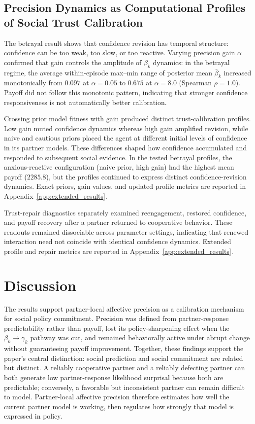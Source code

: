 \documentclass[runningheads,orivec]{llncs}
\begin{document}
\subsection{Precision Dynamics as Computational Profiles of Social Trust Calibration}
\label{sec:phenotypes}

The betrayal result shows that confidence revision has temporal structure: confidence can be too weak, too slow, or too reactive. Varying precision gain $\alpha$ confirmed that gain controls the amplitude of $\beta_k$ dynamics: in the betrayal regime, the average within-episode max--min range of posterior mean $\bar{\beta}_k$ increased monotonically from $0.097$ at $\alpha=0.05$ to $0.675$ at $\alpha=8.0$ (Spearman $\rho=1.0$). Payoff did not follow this monotonic pattern, indicating that stronger confidence responsiveness is not automatically better calibration.

Crossing prior model fitness with gain produced distinct trust-calibration profiles. Low gain muted confidence dynamics whereas high gain amplified revision, while naive and cautious priors placed the agent at different initial levels of confidence in its partner models. These differences shaped how confidence accumulated and responded to subsequent social evidence. In the tested betrayal profiles, the anxious-reactive configuration (naive prior, high gain) had the highest mean payoff ($2285.8$), but the profiles continued to express distinct confidence-revision dynamics. Exact priors, gain values, and updated profile metrics are reported in Appendix~\ref{app:extended_results}.

Trust-repair diagnostics separately examined reengagement, restored confidence, and payoff recovery after a partner returned to cooperative behavior. These readouts remained dissociable across parameter settings, indicating that renewed interaction need not coincide with identical confidence dynamics. Extended profile and repair metrics are reported in Appendix~\ref{app:extended_results}.
\section{Discussion}
\label{sec:discussion}

The results support partner-local affective precision as a calibration mechanism for social policy commitment. Precision was defined from partner-response predictability rather than payoff, lost its policy-sharpening effect when the $\beta_k \rightarrow \gamma_k$ pathway was cut, and remained behaviorally active under abrupt change without guaranteeing payoff improvement. Together, these findings support the paper's central distinction: social prediction and social commitment are related but distinct. A reliably cooperative partner and a reliably defecting partner can both generate low partner-response likelihood surprisal because both are predictable; conversely, a favorable but inconsistent partner can remain difficult to model. Partner-local affective precision therefore estimates how well the current partner model is working, then regulates how strongly that model is expressed in policy.
\end{document}
